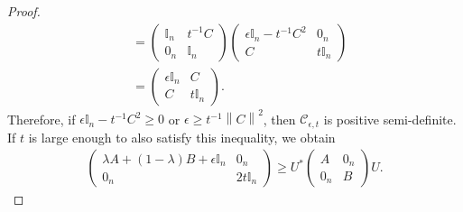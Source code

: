 \documentclass[12pt,a4paper]{amsart}
\theoremstyle{definition}
\newcommand{\mynorm}[1]{ \left\| #1 \right\| }
\begin{document}
\begin{proof}
\begin{align*}
			& = 
			\begin{pmatrix}
				\mathbb{I}_n  &  t^{-1}C  \\
				0_n & \mathbb{I}_n
			\end{pmatrix} 
			\begin{pmatrix}
				\epsilon\mathbb{I}_n - t^{-1}C^{2} &  0_n \\
				C & t \mathbb{I}_n
			\end{pmatrix} \\
			& = 
			\begin{pmatrix}
				\epsilon \mathbb{I}_n  &  C  \\
				C & t \mathbb{I}_n
			\end{pmatrix}.
		\end{align*}
		Therefore, if $ \epsilon\mathbb{I}_n - t^{-1}C^{2} \geq0 $ or $ \epsilon \geq t^{-1}\mynorm{C}^{2}$, then $\mathcal{C}_{\epsilon, t}$ is positive semi-definite. If $t$ is large enough to also satisfy this inequality, we obtain
		\begin{align}\label{monotone-is-concave-eq1}
			\begin{pmatrix}
				\lambda A + (1-\lambda)B + \epsilon \mathbb{I}_n & 0_n \\
				0_n & 2t \mathbb{I}_n
			\end{pmatrix} \geq 
			U^{*} 	
			\begin{pmatrix}
				A &   0_n \\
				0_n & B
			\end{pmatrix}  U. 
		\end{align} 
		

\end{proof}
\end{document}

